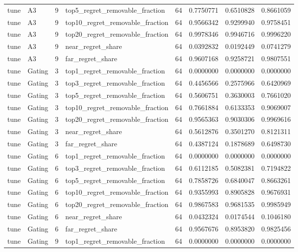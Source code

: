 \begin{tabular}{llrlrrrr}
tune & A3 & 9 & top5_regret_removable_fraction & 64 & 0.7750771 & 0.6510828 & 0.8661059 \\
tune & A3 & 9 & top10_regret_removable_fraction & 64 & 0.9566342 & 0.9299940 & 0.9758451 \\
tune & A3 & 9 & top20_regret_removable_fraction & 64 & 0.9978346 & 0.9946716 & 0.9996220 \\
tune & A3 & 9 & near_regret_share & 64 & 0.0392832 & 0.0192449 & 0.0741279 \\
tune & A3 & 9 & far_regret_share & 64 & 0.9607168 & 0.9258721 & 0.9807551 \\
tune & Gating & 3 & top1_regret_removable_fraction & 64 & 0.0000000 & 0.0000000 & 0.0000000 \\
tune & Gating & 3 & top3_regret_removable_fraction & 64 & 0.4456566 & 0.2575966 & 0.6420969 \\
tune & Gating & 3 & top5_regret_removable_fraction & 64 & 0.5606751 & 0.3630003 & 0.7661020 \\
tune & Gating & 3 & top10_regret_removable_fraction & 64 & 0.7661884 & 0.6133353 & 0.9069007 \\
tune & Gating & 3 & top20_regret_removable_fraction & 64 & 0.9565363 & 0.9030306 & 0.9969616 \\
tune & Gating & 3 & near_regret_share & 64 & 0.5612876 & 0.3501270 & 0.8121311 \\
tune & Gating & 3 & far_regret_share & 64 & 0.4387124 & 0.1878689 & 0.6498730 \\
tune & Gating & 6 & top1_regret_removable_fraction & 64 & 0.0000000 & 0.0000000 & 0.0000000 \\
tune & Gating & 6 & top3_regret_removable_fraction & 64 & 0.6112185 & 0.5082381 & 0.7194822 \\
tune & Gating & 6 & top5_regret_removable_fraction & 64 & 0.7858726 & 0.6840047 & 0.8663261 \\
tune & Gating & 6 & top10_regret_removable_fraction & 64 & 0.9355993 & 0.8905828 & 0.9676931 \\
tune & Gating & 6 & top20_regret_removable_fraction & 64 & 0.9867583 & 0.9681535 & 0.9985949 \\
tune & Gating & 6 & near_regret_share & 64 & 0.0432324 & 0.0174544 & 0.1046180 \\
tune & Gating & 6 & far_regret_share & 64 & 0.9567676 & 0.8953820 & 0.9825456 \\
tune & Gating & 9 & top1_regret_removable_fraction & 64 & 0.0000000 & 0.0000000 & 0.0000000 \\

\end{tabular}
